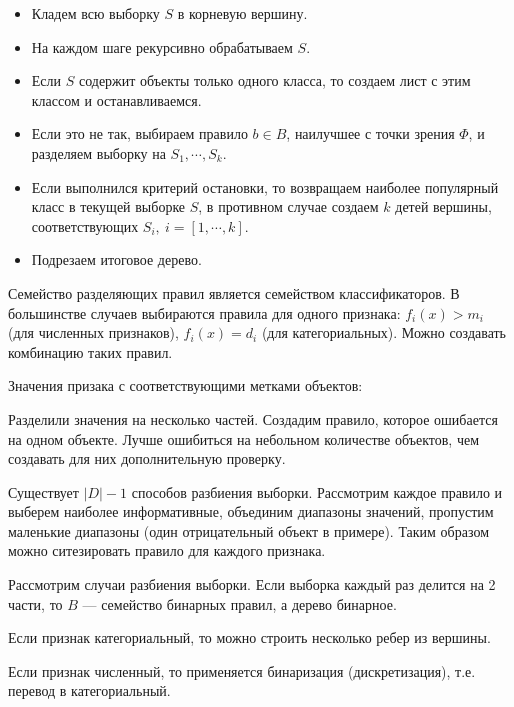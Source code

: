 \begin{itemize}
    \item Кладем всю выборку $S$ в корневую вершину.

    \item На каждом шаге рекурсивно обрабатываем $S$.

    \item Если $S$ содержит объекты только одного класса, то создаем лист с
        этим классом и останавливаемся.

    \item Если это не так, выбираем правило $b \in B$, наилучшее с точки зрения $\Phi$, и
        разделяем выборку на $S_1, \cdots, S_k$.

    \item Если выполнился критерий остановки, то возвращаем наиболее
        популярный класс в текущей выборке $S$, в противном случае создаем $k$
        детей вершины, соответствующих $S_i,\ i = [1, \cdots, k]$.

    \item Подрезаем итоговое дерево.
\end{itemize}

Семейство разделяющих правил является семейством классификаторов. В большинстве
случаев выбираются правила для одного признака: $f_i(x) > m_i$ (для численных
признаков), $f_i(x) = d_i$ (для категориальных).
Можно создавать комбинацию таких правил.

Значения призака с соответствующими метками объектов:


Разделили значения на несколько частей. Создадим правило, которое ошибается на
одном объекте. Лучше ошибиться на небольном количестве объектов, чем создавать
для них дополнительную проверку.

Существует $|D| - 1$ способов разбиения выборки. Рассмотрим каждое правило и
выберем наиболее информативные, объединим диапазоны значений, пропустим
маленькие диапазоны (один отрицательный объект в примере). Таким образом можно
ситезировать правило для каждого признака.

Рассмотрим случаи разбиения выборки. Если выборка каждый раз делится на 2
части, то $B$ --- семейство бинарных правил, а дерево бинарное.

Если признак категориальный, то можно строить несколько ребер из вершины.

Если признак численный, то применяется бинаризация (дискретизация), т.е.
перевод в категориальный.

